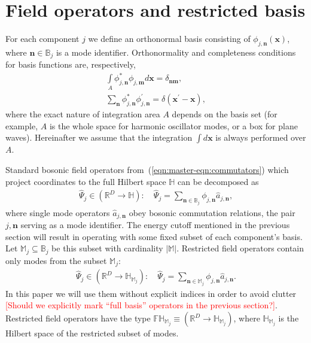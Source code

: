 \documentclass[12pt,aip,jmp,amssymb,amsmath]{revtex4-1}
\newcommand{\todo}[1]{\textcolor{red}{[#1]}}
\newcommand{\mvec}{\boldsymbol{m}}
\newcommand{\nvec}{\boldsymbol{n}}
\newcommand{\xvec}{\boldsymbol{x}}
\newcommand{\Psiop}{\hat{\Psi}}
\newcommand{\fullbasis}{\mathbb{B}}
\newcommand{\restbasis}{\mathbb{M}}
\newcommand{\eqnref}[1]{(\ref{eqn:#1})}
\begin{document}
\section{Field operators and restricted basis}
\label{sec:func-operators}

For each component $j$ we define an orthonormal basis consisting of $\phi_{j,\nvec}(\xvec)$, where $\nvec \in \fullbasis_j$ is a mode identifier.
Orthonormality and completeness conditions for basis functions are, respectively,
\begin{align}
    \int\limits_A \phi_{j,\nvec}^* \phi_{j,\mvec} d\xvec = \delta_{\nvec\mvec}, \\
    \sum_{\nvec} \phi_{j,\nvec}^* \phi_{j,\nvec}^\prime = \delta(\xvec^\prime - \xvec),
\end{align}
where the exact nature of integration area $A$ depends on the basis set (for example, $A$ is the whole space for harmonic oscillator modes, or a box for plane waves).
Hereinafter we assume that the integration $\int d\xvec$ is always performed over $A$.

Standard bosonic field operators from~\eqnref{master-eqn:commutators} which project coordinates to the full Hilbert space $\mathbb{H}$ can be decomposed as
\begin{equation}\begin{split}
    \Psiop_j \in (\mathbb{R}^D \rightarrow \mathbb{H}): \quad
    \Psiop_j = \sum_{\nvec \in \fullbasis_j} \phi_{j,\nvec} \hat{a}_{j,\nvec},
\end{split}\end{equation}
where single mode operators $\hat{a}_{j,\nvec}$ obey bosonic commutation relations, the pair $j,\nvec$ serving as a mode identifier.
The energy cutoff mentioned in the previous section will result in operating with some fixed subset of each component's basis.
Let $\restbasis_j \subseteq \fullbasis_j$ be this subset with cardinality $|\restbasis|$.
Restricted field operators contain only modes from the subset $\restbasis_j$:
\begin{equation}\begin{split}
    \Psiop_j \in (\mathbb{R}^D \rightarrow \mathbb{H}_{\restbasis_j}): \quad
    \Psiop_j = \sum_{\nvec \in \restbasis_j} \phi_{j,\nvec} \hat{a}_{j,\nvec}.
\end{split}\end{equation}
In this paper we will use them without explicit indices in order to avoid clutter \todo{Should we explicitly mark ``full basis'' operators in the previous section?}.
Restricted field operators have the type $\mathbb{FH}_{\restbasis_j} \equiv (\mathbb{R}^D \rightarrow \mathbb{H}_{\restbasis_j})$, where $\mathbb{H}_{\restbasis_j}$ is the Hilbert space of the restricted subset of modes.
\end{document}
